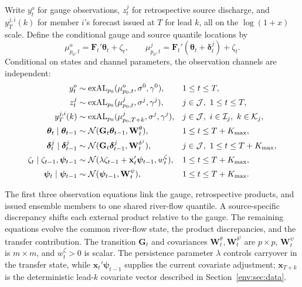 Write $y_t^o$ for gauge observations, $z_t^j$ for retrospective source
discharge, and $y_T^{j,i}(k)$ for member $i$'s forecast issued at $T$ for lead
$k$, all on the $\log(1+x)$ scale. Define the conditional gauge and source
quantile locations by
\[
\mu^o_{p_0,t}=\mathbf F_t'\boldsymbol\theta_t+\zeta_t,
\qquad
\mu^j_{p_0,t}=\mathbf F_t'(\boldsymbol\theta_t+\boldsymbol\delta_t^j)
+\zeta_t.
\]
Conditional on states and channel parameters, the observation channels are
independent:
\begingroup
{}
\begin{align}
y_t^o
&\sim \operatorname{exAL}_{p_0}
  (\mu^o_{p_0,t},\sigma^0,\gamma^0),
&&1\le t\le T, \label{env:eq:unified_usgs}\\
z_t^j
&\sim \operatorname{exAL}_{p_0}
  (\mu^j_{p_0,t},\sigma^j,\gamma^j),
&&j\in\mathcal J,\ 1\le t\le T, \label{env:eq:unified_retro}\\
y_T^{j,i}(k)
&\sim \operatorname{exAL}_{p_0}
  (\mu^j_{p_0,T+k},\sigma^j,\gamma^j),
&&j\in\mathcal J,\ i\in\mathcal I_j,\ k\in\mathcal K_j, \notag\\
\boldsymbol\theta_t\mid\boldsymbol\theta_{t-1}
&\sim \mathcal N(\mathbf G_t\boldsymbol\theta_{t-1},\mathbf W_t^\theta),
&&1\le t\le T+K_{\max}, \label{env:eq:unified_theta}\\
\boldsymbol\delta_t^j\mid\boldsymbol\delta_{t-1}^j
&\sim \mathcal N(\mathbf G_t\boldsymbol\delta_{t-1}^j,
                  \mathbf W_t^{\delta^j}),
&&j\in\mathcal J,\ 1\le t\le T+K_{\max}, \label{env:eq:unified_delta}\\
\zeta_t\mid\zeta_{t-1},\boldsymbol\psi_{t-1}
&\sim \mathcal N(\lambda\zeta_{t-1}+\mathbf x_t'\boldsymbol\psi_{t-1},
                  w_t^\zeta),
&&1\le t\le T+K_{\max}, \label{env:eq:unified_transfer}\\
\boldsymbol\psi_t\mid\boldsymbol\psi_{t-1}
&\sim \mathcal N(\boldsymbol\psi_{t-1},\mathbf W_t^\psi),
&&1\le t\le T+K_{\max}. \notag
\end{align}
\endgroup

The first three observation equations link the gauge, retrospective products,
and issued ensemble members to one shared river-flow quantile. A
source-specific discrepancy shifts each external product relative to the gauge.
The remaining equations evolve the common river-flow state, the product
discrepancies, and the transfer contribution. The transition $\mathbf G_t$ and
covariances $\mathbf W_t^\theta,\mathbf W_t^{\delta^j}$ are $p\times p$,
$\mathbf W_t^\psi$ is $m\times m$, and $w_t^\zeta>0$ is scalar. The persistence
parameter $\lambda$ controls carryover in the transfer state, while
$\mathbf x_t'\boldsymbol\psi_{t-1}$ supplies the current covariate adjustment;
$\mathbf x_{T+k}$ is the deterministic lead-$k$ covariate vector described in
Section~\ref{env:sec:data}.

